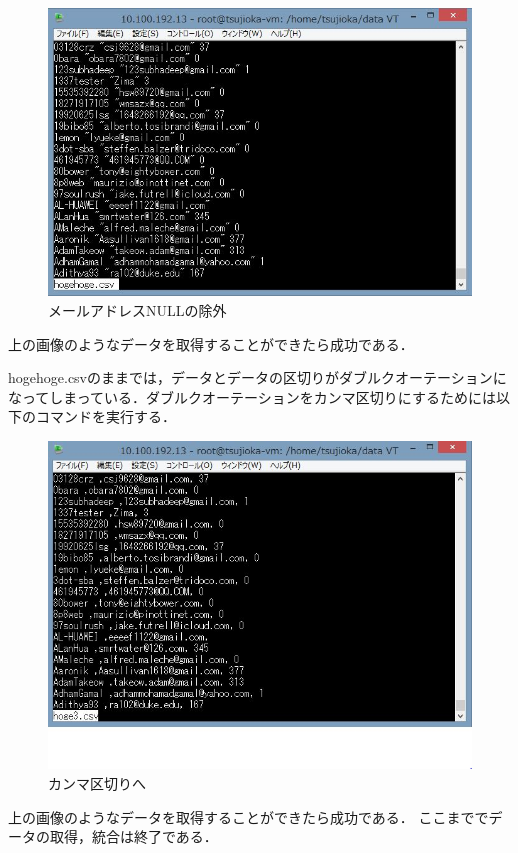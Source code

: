 \begin{figure}[htb]
\centering
\includegraphics[width=12cm]{hogehoge.JPG}
\caption{メールアドレスNULLの除外}\label{サンプル図}
\end{figure}

上の画像のようなデータを取得することができたら成功である．


\newpage

hogehoge.csvのままでは，データとデータの区切りがダブルクオーテーションになってしまっている．ダブルクオーテーションをカンマ区切りにするためには以下のコマンドを実行する．



\begin{figure}[htb]
\centering
\includegraphics[width=12cm]{hoge3.JPG}
\caption{カンマ区切りへ}\label{サンプル図}
\end{figure}
上の画像のようなデータを取得することができたら成功である．
ここまででデータの取得，統合は終了である．

